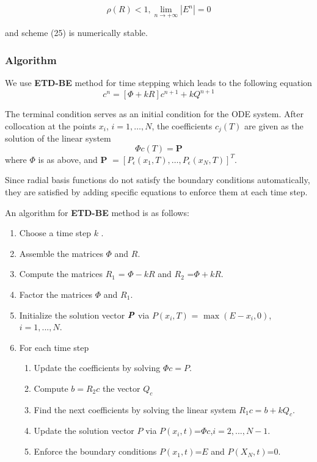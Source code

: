 \documentclass[12pt]{article}
\numberwithin{equation}{section} %
\begin{document}
\begin{equation*}
\rho(R)<1, \lim_{n \rightarrow +\infty} |E^n|= 0
\end{equation*}

and scheme (25) is numerically stable.


\subsubsection{Algorithm}
 We use   \textbf{ETD-BE} method for time stepping which leads to the following equation\\
\vspace{5mm}
\begin{equation}
[\Phi-kR]c^n=[\Phi +kR]c^{n+1}+kQ^{n+1}
\end{equation}

The terminal condition serves as an initial condition for the ODE
system. After collocation at the points $x_i$, $i=1,\ldots,N$, the
coefficients $c_j(T)$ are given as the solution of the linear system
\begin{equation*}
\Phi c(T)=\textbf{P}
\end{equation*}
where $\Phi$ is as above, and
  $ \textbf{P }= [P_\epsilon(x_1,T),\ldots,P_\epsilon(x_N,T)]^T$.

Since  radial basis functions do not satisfy the boundary conditions
automatically, they are satisfied by adding specific equations to
enforce them at each time step.

An algorithm for  \textbf{ETD-BE} method is as follows:

\begin{enumerate}
\item Choose a time step $k$ .
\item Assemble the matrices $\Phi$ and $R$.
\item Compute the matrices $R_1$ = $\Phi-k R$ and $R_2$ =$ \Phi+kR$.
\item Factor the matrices $\Phi$ and $R_1$.
\item Initialize the solution vector  $\textit{\textbf{P}}$ via $P(x_i,T)$ = $\max (E-x_i,0)$, $i=1,...,N$.
\item For each time step
\begin{enumerate}
\item Update the coefficients by solving $\Phi c=P$.
\item Compute $ b=R_{2}c$ the vector $Q_c$
\item Find the next coefficients by solving the linear system $R_{1}c=b+kQ_{c}$.
\item Update the solution vector $P$ via $P(x_i,t)$=$\Phi c$,$i=2,...,N-1$.
\item Enforce the boundary conditions $P(x_1,t)$=$E$ and $P(X_N,t)$=$0$.
\end{enumerate}
\end{enumerate}
\end{document}
